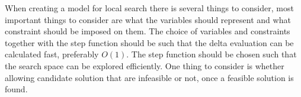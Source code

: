 When creating a model for local search there is several things to consider, most important things to consider are what 
the variables should represent and what constraint should be imposed on them. The choice of variables and constraints 
together with the step function should be such that the delta evaluation can be calculated fast, preferably $O(1)$. The 
step function should be chosen such that the search space can be explored efficiently. One thing to consider is whether 
allowing candidate solution that are infeasible or not, once a feasible solution is found.  
